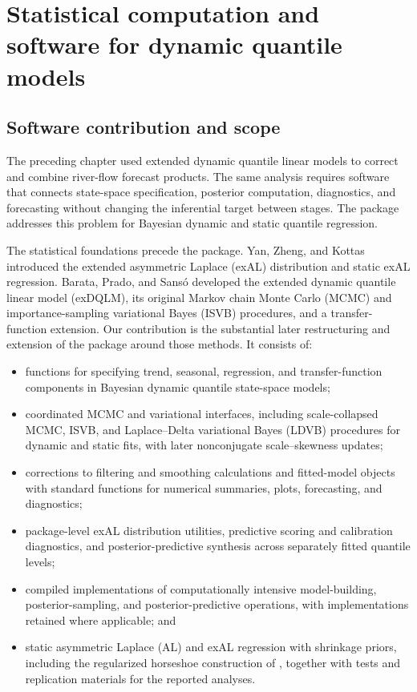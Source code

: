 \chapter{Statistical computation and software for dynamic quantile models}
\label{ch:research-a}

\section{Software contribution and scope}

The preceding chapter used extended dynamic quantile linear models to correct
and combine river-flow forecast products. The same analysis requires software that
connects state-space specification, posterior computation, diagnostics, and
forecasting without changing the inferential target between stages. The
 package  addresses this problem for Bayesian dynamic
and static quantile regression.

The statistical foundations precede the package. Yan, Zheng, and Kottas
\citep{exd-yan2025family} introduced the extended asymmetric Laplace (exAL)
distribution and static exAL regression. Barata, Prado, and Sans\'o
\citep{exd-me} developed the extended dynamic quantile linear model (exDQLM),
its original Markov chain Monte Carlo (MCMC) and importance-sampling
variational Bayes (ISVB) procedures, and a transfer-function extension. Our
contribution is the substantial later restructuring and extension of the
package around those methods. It consists of:
\begin{itemize}
\item functions for specifying trend, seasonal, regression, and
transfer-function components in Bayesian dynamic quantile state-space models;
\item coordinated MCMC and variational interfaces, including scale-collapsed
MCMC, ISVB, and Laplace--Delta variational Bayes (LDVB) procedures for dynamic
and static fits, with later nonconjugate scale--skewness updates;
\item corrections to filtering and smoothing calculations and fitted-model
objects with standard functions for numerical summaries, plots, forecasting,
and diagnostics;
\item package-level exAL distribution utilities, predictive scoring and
calibration diagnostics, and posterior-predictive synthesis across separately
fitted quantile levels;
\item compiled  implementations of computationally intensive
model-building, posterior-sampling, and posterior-predictive operations, with
 implementations retained where applicable; and
\item static asymmetric Laplace (AL) and exAL regression with shrinkage priors,
including the regularized horseshoe construction of
\citet{exd-nishimura2023shrunken}, together with tests and replication
materials for the reported analyses.
\end{itemize}

